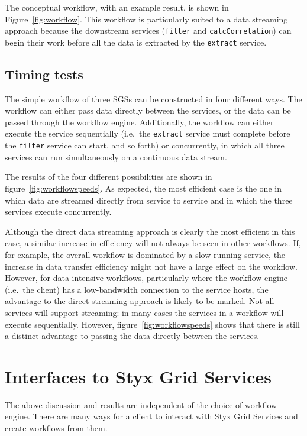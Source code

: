 \documentclass[a4paper]{article}
\begin{document}
The conceptual workflow, with an example result, is shown in Figure~\ref{fig:workflow}.  This workflow is particularly suited to a data streaming approach because the downstream services (\texttt{filter} and \texttt{calcCorrelation}) can begin their work before all the data is extracted by the \texttt{extract} service.

\subsection{Timing tests}
The simple workflow of three SGSs can be constructed in four different ways.  The workflow can either pass data directly between the services, or the data can be passed through the workflow engine.  Additionally, the workflow can either execute the service sequentially (i.e.\ the \texttt{extract} service must complete before the \texttt{filter} service can start, and so forth) or concurrently, in which all three services can run simultaneously on a continuous data stream.

The results of the four different possibilities are shown in figure~\ref{fig:workflowspeeds}.  As expected, the most efficient case is the one in which data are streamed directly from service to service and in which the three services execute concurrently.

Although the direct data streaming approach is clearly the most efficient in this case, a similar increase in efficiency will not always be seen in other workflows.  If, for example, the overall workflow is dominated by a slow-running service, the increase in data transfer efficiency might not have a large effect on the workflow.  However, for data-intensive workflows, particularly where the workflow engine (i.e.\ the client) has a low-bandwidth connection to the service hosts, the advantage to the direct streaming approach is likely to be marked.  Not all services will support streaming: in many cases the services in a workflow will execute sequentially.  However, figure~\ref{fig:workflowspeeds} shows that there is still a distinct advantage to passing the data directly between the services.


\section{Interfaces to Styx Grid Services}\label{sec:interfaces}

The above discussion and results are independent of the choice of workflow engine.  There are many ways for a client to interact with Styx Grid Services and create workflows from them.
\end{document}
